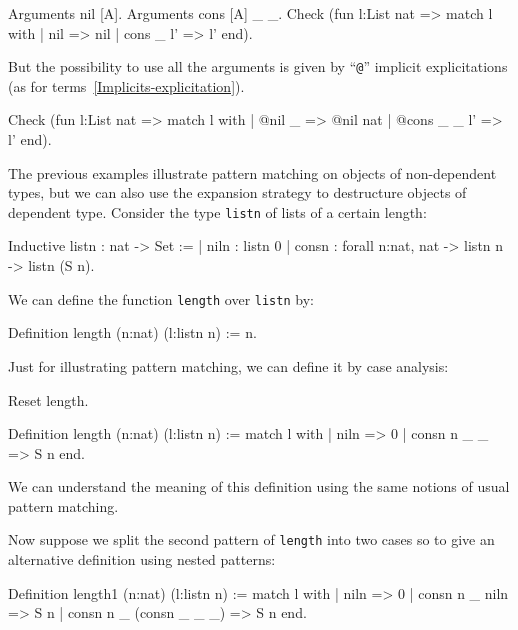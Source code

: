 \begin{coq_example}
Arguments nil [A].
Arguments cons [A] _ _.
Check
  (fun l:List nat =>
     match l with
     | nil => nil
     | cons _ l' => l'
     end).
\end{coq_example}

But the possibility to use all the arguments is given by ``{\tt @}'' implicit
explicitations (as for terms~\ref{Implicits-explicitation}).

\begin{coq_example}
Check
  (fun l:List nat =>
     match l with
     | @nil _ => @nil nat
     | @cons _ _ l' => l'
     end).
\end{coq_example}

The previous examples illustrate pattern matching on objects of
non-dependent types, but we can also
use the expansion strategy to destructure objects of dependent type.
Consider the type \texttt{listn} of lists of a certain length:
\label{listn}

\begin{coq_example}
Inductive listn : nat -> Set :=
  | niln : listn 0
  | consn : forall n:nat, nat -> listn n -> listn (S n).
\end{coq_example}

We can define the function \texttt{length} over \texttt{listn} by:

\begin{coq_example}
Definition length (n:nat) (l:listn n) := n.
\end{coq_example}

Just for illustrating pattern matching,
we can define it by case analysis:

\begin{coq_eval}
Reset length.
\end{coq_eval}
\begin{coq_example}
Definition length (n:nat) (l:listn n) :=
  match l with
  | niln => 0
  | consn n _ _ => S n
  end.
\end{coq_example}

We can understand the meaning of this definition using the
same notions of usual pattern matching.

%
%
\iffalse
Now suppose we split the second pattern  of \texttt{length} into two
cases so to give an
alternative definition using nested patterns:
\begin{coq_example}
Definition length1 (n:nat) (l:listn n) :=
  match l with
  | niln => 0
  | consn n _ niln => S n
  | consn n _ (consn _ _ _) => S n
  end.
\end{coq_example}

